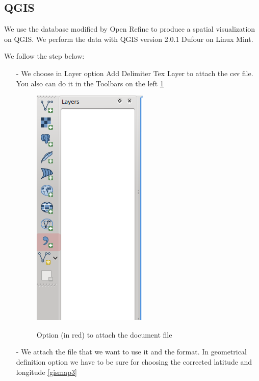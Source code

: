 \documentclass[10pt,a4paper]{article}
\begin{document}
\subsection{QGIS}

We use the database modified by Open Refine to produce a spatial visualization on QGIS. We perform the data with QGIS version 2.0.1 Dufour on Linux Mint. 

We follow the step below:
\begin{itemize}
\item[-] We choose in Layer option Add Delimiter Tex Layer to attach the csv file. You also can do it in the Toolbars on the left \ref{gismap2}
\begin{figure}[hdp]
\centering
\includegraphics[scale=0.50]{gismap2.png}
\label{gismap2}
\caption{Option (in red) to attach the document file}
\end{figure}
\item[-] We attach the file that we want to use it and the format. In geometrical definition option we have to be sure for choosing the corrected latitude and longitude \ref{gismap3}


\end{itemize}
\end{document}
